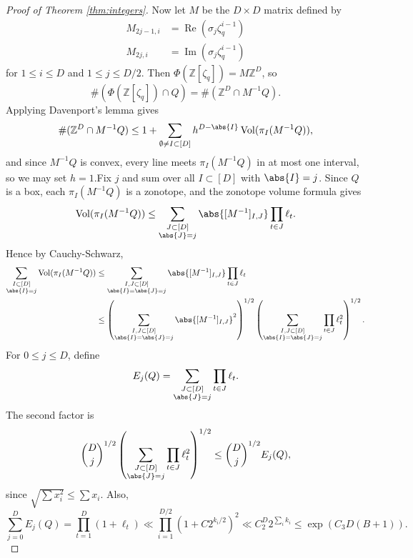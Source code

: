 \documentclass{article}
\newcommand{\bZ}{\mathbb{Z}}
\DeclareMathOperator{\Vol}{Vol}
\begin{document}
\begin{proof}[Proof of Theorem \ref{thm:integers}]
Now let $M$ be the $D \times D$ matrix defined by
\begin{align*}
M_{2j-1,i} &= \operatorname{Re}(\sigma_j \zeta_q^{i-1})
\\
M_{2j,i} &= \operatorname{Im}(\sigma_j \zeta_q^{i-1})
\end{align*}
for $1 \leq i \leq D$ and $1 \leq j \leq D/2$. Then $\Phi(\bZ[\zeta_q])=M\bZ^D$, so
\[
\#(\Phi(\bZ[\zeta_q]) \cap Q)
=
\#(\bZ^D \cap M^{-1}Q).
\]
Applying Davenport's lemma gives
\[
\#(\bZ^D \cap M^{-1}Q)
\leq
1+\sum_{\emptyset \neq I \subset [D]} h^{D-\abs{I}} \Vol(\pi_I(M^{-1}Q)),
\]
and since $M^{-1}Q$ is convex, every line meets $\pi_I(M^{-1} Q)$ in at most one interval, so we may set $h=1$.Fix $j$ and sum over all $I \subset [D]$ with $\abs{I}=j$. Since $Q$ is a box, each $\pi_I(M^{-1}Q)$ is a zonotope, and the zonotope volume formula gives
\[
\Vol(\pi_I(M^{-1}Q))
\leq
\sum_{\substack{J \subset [D] \\ \abs{J}=j}}
\abs{[M^{-1}]_{I,J}}
\prod_{t \in J} \ell_t.
\]
Hence by Cauchy-Schwarz,
\begin{align*}
\sum_{\substack{I \subset [D] \\ \abs{I}=j}} \Vol(\pi_I(M^{-1}Q))
&\leq
\sum_{\substack{I,J \subset [D] \\ \abs{I}=\abs{J}=j}}
\abs{[M^{-1}]_{I,J}}
\prod_{t \in J} \ell_t \\
&\leq
\left(
\sum_{\substack{I,J \subset [D] \\ \abs{I}=\abs{J}=j}}
\abs{[M^{-1}]_{I,J}}^2
\right)^{1/2}
\left(
\sum_{\substack{I,J \subset [D] \\ \abs{I}=\abs{J}=j}}
\prod_{t \in J} \ell_t^2
\right)^{1/2}.
\end{align*}
For $0 \leq j \leq D$, define
\[
E_j(Q)=\sum_{\substack{J \subset [D] \\ \abs{J}=j}} \prod_{t \in J} \ell_t.
\]
The second factor is
\[
\binom{D}{j}^{1/2} \left( \sum_{\substack{J \subset [D] \\ \abs{J}=j}} \prod_{t \in J} \ell_t^2 \right)^{1/2}
\leq
\binom{D}{j}^{1/2} E_j(Q),
\]
since $\sqrt{\sum x_i^2} \leq \sum x_i$.
Also,
\[
\sum_{j=0}^D E_j(Q)=\prod_{t=1}^D (1+\ell_t)
\ll
\prod_{i=1}^{D/2} (1+C 2^{k_i/2})^2
\ll
C_2^D 2^{\sum_i k_i}
\leq
\exp(C_3 D(B+1)).
\]


\end{proof}
\end{document}
